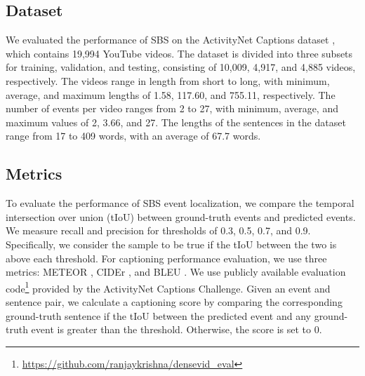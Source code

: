 \subsection{Dataset}
\label{subsec:exp_dataset}
We evaluated the performance of SBS on the ActivityNet Captions dataset \cite{krishna2017dense}, which contains 19,994 YouTube videos.
The dataset is divided into three subsets for training, validation, and testing, consisting of 10,009, 4,917, and 4,885 videos, respectively.
The videos range in length from short to long, with minimum, average, and maximum lengths of 1.58, 117.60, and 755.11, respectively.
The number of events per video ranges from 2 to 27, with minimum, average, and maximum values of 2, 3.66, and 27.
The lengths of the sentences in the dataset range from 17 to 409 words, with an average of 67.7 words.

\subsection{Metrics}
To evaluate the performance of SBS event localization, we compare the temporal intersection over union (tIoU) between ground-truth events and predicted events.
We measure recall and precision for thresholds of 0.3, 0.5, 0.7, and 0.9. Specifically, we consider the sample to be true if the tIoU between the two is above each threshold.
For captioning performance evaluation, we use three metrics: METEOR \cite{banerjee2005meteor}, CIDEr \cite{vedantam2015cider}, and BLEU \cite{papineni2002bleu}.
We use publicly available evaluation code\footnote{\url{https://github.com/ranjaykrishna/densevid_eval}} provided by the ActivityNet Captions Challenge.
Given an event and sentence pair, we calculate a captioning score by comparing the corresponding ground-truth sentence if the tIoU between the predicted event and any ground-truth event is greater than the threshold. Otherwise, the score is set to 0.

